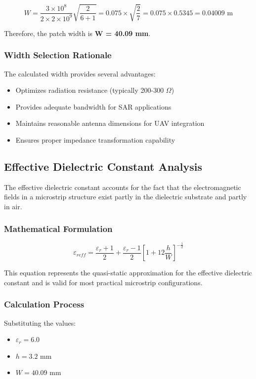 \documentclass[12pt]{article}
\begin{document}
\[W = \frac{3 \times 10^8}{2 \times 2 \times 10^9}\sqrt{\frac{2}{6 + 1}} = 0.075 \times \sqrt{\frac{2}{7}} = 0.075 \times 0.5345 = 0.04009 \text{ m}\]

Therefore, the patch width is \textbf{W = 40.09 mm}.

\subsubsection{Width Selection Rationale}

The calculated width provides several advantages:
\begin{itemize}
    \item Optimizes radiation resistance (typically 200-300 $\Omega$)
    \item Provides adequate bandwidth for SAR applications
    \item Maintains reasonable antenna dimensions for UAV integration
    \item Ensures proper impedance transformation capability
\end{itemize}

\subsection{Effective Dielectric Constant Analysis}

The effective dielectric constant accounts for the fact that the electromagnetic fields in a microstrip structure exist partly in the dielectric substrate and partly in air.

\subsubsection{Mathematical Formulation}

\[\varepsilon_{reff} = \frac{\varepsilon_r + 1}{2} + \frac{\varepsilon_r - 1}{2}\left[1 + 12\frac{h}{W}\right]^{-\frac{1}{2}}\]

This equation represents the quasi-static approximation for the effective dielectric constant and is valid for most practical microstrip configurations.

\subsubsection{Calculation Process}

Substituting the values:
\begin{itemize}
    \item $\varepsilon_r = 6.0$
    \item $h = 3.2$ mm
    \item $W = 40.09$ mm
\end{itemize}
\end{document}
